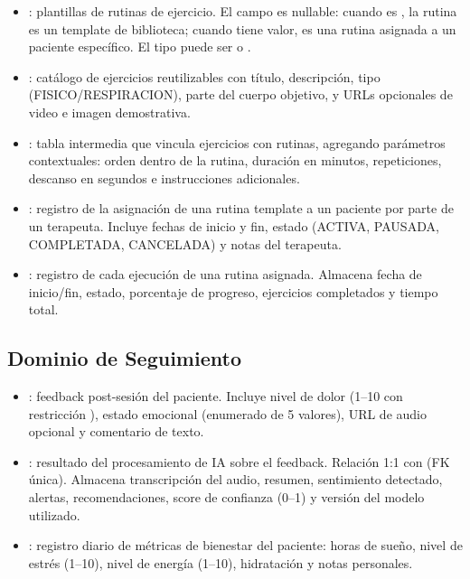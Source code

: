 \begin{itemize}
  \item {}: plantillas de rutinas de ejercicio. El campo  es nullable: cuando es , la rutina es un template de biblioteca; cuando tiene valor, es una rutina asignada a un paciente específico. El tipo puede ser  o .

  \item {}: catálogo de ejercicios reutilizables con título, descripción, tipo (FISICO/RESPIRACION), parte del cuerpo objetivo, y URLs opcionales de video e imagen demostrativa.

  \item {}: tabla intermedia que vincula ejercicios con rutinas, agregando parámetros contextuales: orden dentro de la rutina, duración en minutos, repeticiones, descanso en segundos e instrucciones adicionales.

  \item {}: registro de la asignación de una rutina template a un paciente por parte de un terapeuta. Incluye fechas de inicio y fin, estado (ACTIVA, PAUSADA, COMPLETADA, CANCELADA) y notas del terapeuta.

  \item {}: registro de cada ejecución de una rutina asignada. Almacena fecha de inicio/fin, estado, porcentaje de progreso, ejercicios completados y tiempo total.
\end{itemize}

\subsection{Dominio de Seguimiento}

\begin{itemize}
  \item {}: feedback post-sesión del paciente. Incluye nivel de dolor (1--10 con restricción ), estado emocional (enumerado de 5 valores), URL de audio opcional y comentario de texto.

  \item {}: resultado del procesamiento de IA sobre el feedback. Relación 1:1 con  (FK única). Almacena transcripción del audio, resumen, sentimiento detectado, alertas, recomendaciones, score de confianza (0--1) y versión del modelo utilizado.

  \item {}: registro diario de métricas de bienestar del paciente: horas de sueño, nivel de estrés (1--10), nivel de energía (1--10), hidratación y notas personales.
\end{itemize}

